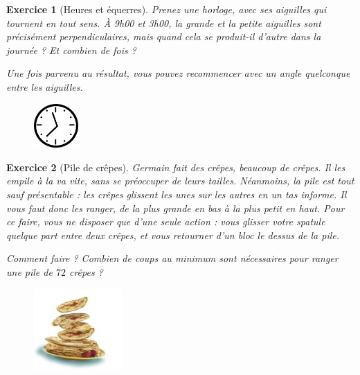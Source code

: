 \documentclass[12pt]{article}
\theoremstyle{break}
\newtheorem{exo}{Exercice}
\begin{document}
\begin{exo}[Heures et équerres]
Prenez une horloge, avec ses aiguilles qui tournent en tout sens. À 9h00 et 3h00, la grande et la petite aiguilles sont précisément perpendiculaires, mais quand cela se produit-il d'autre dans la journée ? Et combien de fois ?

Une fois parvenu au résultat, vous pouvez recommencer avec un angle quelconque entre les aiguilles.

\begin{figure}[h!]
	\centering
    \includegraphics[width=0.15\textwidth]{images/horloge.png}
\end{figure}
\end{exo}


\begin{exo}[Pile de crêpes]
Germain fait des crêpes, beaucoup de crêpes. Il les empile à la va vite, sans se préoccuper de leurs tailles. Néanmoins, la pile est tout sauf présentable : les crêpes glissent les unes sur les autres en un tas informe. Il vous faut donc les ranger, de la plus grande en bas à la plus petit en haut. Pour ce faire, vous ne disposer que d'une seule action : vous glisser votre spatule quelque part entre deux crêpes, et vous retourner d'un bloc le dessus de la pile.

Comment faire ? Combien de coups au minimum sont nécessaires pour ranger une pile de $72$ crêpes ?

\begin{figure}[h!]
	\centering
    \includegraphics[width=0.3\textwidth]{images/PileDeCrepes.jpg}
\end{figure}
\end{exo}
\end{document}
